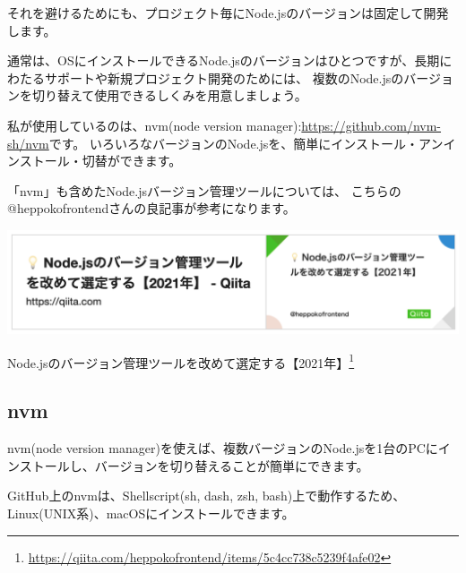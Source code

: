 \vspace*{\baselineskip}

それを避けるためにも、プロジェクト毎にNode.jsのバージョンは固定して開発します。

\vspace*{\baselineskip}

通常は、OSにインストールできるNode.jsのバージョンはひとつですが、長期にわたるサポートや新規プロジェクト開発のためには、
複数のNode.jsのバージョンを切り替えて使用できるしくみを用意しましょう。

\vspace*{\baselineskip}

私が使用しているのは、nvm(node version manager):\url{https://github.com/nvm-sh/nvm}です。
いろいろなバージョンのNode.jsを、簡単にインストール・アンインストール・切替ができます。

\vspace*{\baselineskip}

「nvm」も含めたNode.jsバージョン管理ツールについては、
こちらの@heppokofrontendさんの良記事が参考になります。

\begin{reviewimage}%
\includegraphics[width=1.0\maxwidth]{./images/01-createDevEnv/01_nodeVersionChange.png}%
\label{image:01-createDevEnv:01_nodeVersionChange}
\end{reviewimage}

Node.jsのバージョン管理ツールを改めて選定する【2021年】\footnote{\url{https://qiita.com/heppokofrontend/items/5c4cc738c5239f4afe02}}

\subsection{nvm}
\keeplastskip{
  \label{sec:1-1-3}
  \par\nobreak
}

nvm(node version manager)を使えば、複数バージョンのNode.jsを1台のPCにインストールし、バージョンを切り替えることが簡単にできます。

\vspace*{\baselineskip}

GitHub上のnvmは、Shellscript(sh, dash, zsh, bash)上で動作するため、Linux(UNIX系)、macOSにインストールできます。


